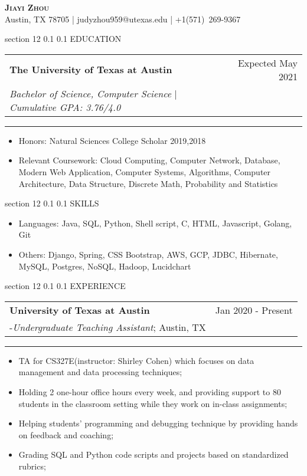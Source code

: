 \documentclass[letter,10.5pt]{article}
\makeatletter
\renewcommand{\section}{\@startsection
  {section}
  {12}
  {\z@}
  {0.1\baselineskip}
  {0.1\baselineskip}
  {\ruled@title}}
\newcommand{\ruled@title}[1]{
  \normalfont\large\scshape\bfseries #1\vskip2pt\hrule\vspace{0pt}}
\newcommand{\restitle}[3]{
  \begin{center}
    {\bfseries\scshape\Large #1}\\
    \vspace{3pt}
    #2\\
    #3
  \end{center}
}
\newcommand{\resentry}[4]{
  \begin{minipage}[t]{\linewidth}
    \setlength\tabcolsep{0pt}
    \begin{tabular*}{\linewidth}{l@{\extracolsep{\fill}}r@{}}
      \textbf{#1} & #2 \\ #3 \\
    \end{tabular*}
    \rule{3pt}{0pt}
	#4
  \end{minipage}
}
\newenvironment{resitemize}
{\vspace{-10pt}
\begin{itemize}
\setlength{\parskip}{0ex}
\setlength{\leftskip}{-14pt}}
{\end{itemize}}
\makeatother
\begin{document}
\restitle{Jiayi Zhou}
{Austin, TX 78705 | judyzhou959@utexas.edu | +1(571)\ 269-9367 }{}


\section{EDUCATION}
\resentry
{The University of Texas at Austin }
{Expected May 2021}
{\emph{Bachelor of Science, Computer Science} | \emph{Cumulative GPA: 3.76/4.0}}

{
\begin{resitemize}
\item Honors: Natural Sciences College Scholar 2019,2018
\item Relevant Coursework: Cloud Computing, Computer Network, Database, Modern Web Application, Computer Systems, Algorithms, Computer Architecture, Data Structure, Discrete Math, Probability and Statistics

\end{resitemize}
 }
 
\section{SKILLS}
\vspace{12pt}
\begin{resitemize}
\item Languages: Java, SQL, Python, Shell script, C, HTML, Javascript, Golang, Git
\item Others: Django, Spring, CSS Bootstrap, AWS, GCP, JDBC, Hibernate, MySQL, Postgres, NoSQL, Hadoop, Lucidchart 
\end{resitemize}

\section{EXPERIENCE}
\resentry
{University of Texas at Austin}
{Jan 2020 - Present}
{ -\emph{Undergraduate Teaching Assistant}; Austin, TX}

{
\begin{resitemize}
\item TA for CS327E(instructor: Shirley Cohen) which focuses on data management and data processing techniques;
\item Holding 2 one-hour office hours every week, and providing support to 80 students in the classroom setting while they work on in-class assignments;
\item Helping students’ programming and debugging technique by providing hands on feedback and coaching;
\item Grading SQL and Python code scripts and projects based on standardized rubrics;
\end{resitemize}
 }
 
\end{document}

